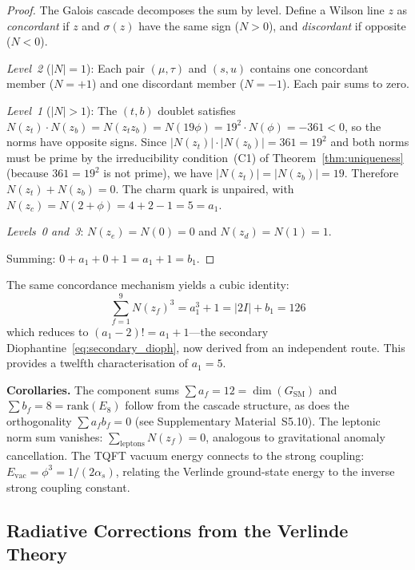 \documentclass[12pt,a4paper]{article}
\theoremstyle{definition}
\begin{document}
\begin{proof}
The Galois cascade decomposes the sum by level.  Define a Wilson line $z$ as \emph{concordant} if $z$ and $\sigma(z)$ have the same sign ($N > 0$), and \emph{discordant} if opposite ($N < 0$).

\emph{Level~2} ($|N| = 1$): Each pair $(\mu, \tau)$ and $(s, u)$ contains one concordant member ($N = +1$) and one discordant member ($N = -1$).  Each pair sums to zero.

\emph{Level~1} ($|N| > 1$): The $(t, b)$ doublet satisfies $N(z_t) \cdot N(z_b) = N(z_t z_b) = N(19\phi) = 19^2 \cdot N(\phi) = -361 < 0$, so the norms have opposite signs.  Since $|N(z_t)| \cdot |N(z_b)| = 361 = 19^2$ and both norms must be prime by the irreducibility condition~(C1) of Theorem~\ref{thm:uniqueness} (because $361 = 19^2$ is not prime), we have $|N(z_t)| = |N(z_b)| = 19$.  Therefore $N(z_t) + N(z_b) = 0$.  The charm quark is unpaired, with $N(z_c) = N(2 + \phi) = 4 + 2 - 1 = 5 = a_1$.

\emph{Levels~0 and~3}: $N(z_e) = N(0) = 0$ and $N(z_d) = N(1) = 1$.

Summing: $0 + a_1 + 0 + 1 = a_1 + 1 = b_1$.
\end{proof}

\noindent The same concordance mechanism yields a cubic identity:
\begin{equation}
\sum_{f=1}^{9} N(z_f)^3 = a_1^3 + 1 = |2I| + b_1 = 126
\label{eq:cubic_norm}
\end{equation}
which reduces to $(a_1 - 2)! = a_1 + 1$---the secondary Diophantine~\eqref{eq:secondary_dioph}, now derived from an independent route.  This provides a twelfth characterisation of $a_1 = 5$.

\noindent\textbf{Corollaries.}  The component sums $\sum a_f = 12 = \dim(G_{\text{SM}})$ and $\sum b_f = 8 = \mathrm{rank}(E_8)$ follow from the cascade structure, as does the orthogonality $\sum a_f b_f = 0$ (see Supplementary Material~S5.10).  The leptonic norm sum vanishes: $\sum_{\text{leptons}} N(z_f) = 0$, analogous to gravitational anomaly cancellation.  The TQFT vacuum energy connects to the strong coupling: $E_{\text{vac}} = \phi^3 = 1/(2\alpha_s)$, relating the Verlinde ground-state energy to the inverse strong coupling constant.

\subsection{Radiative Corrections from the Verlinde Theory}
\label{sec:oneloop}
\end{document}
